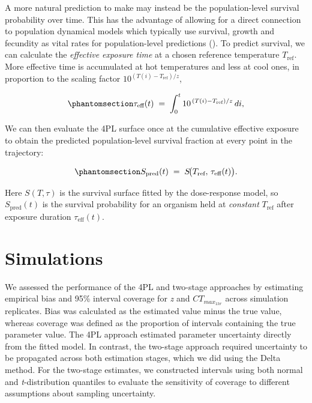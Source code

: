 \documentclass[
  11pt,
]{article}
\begin{document}
A more natural prediction to make may instead be the population-level
survival probability over time. This has the advantage of allowing for a
direct connection to population dynamical models which typically use
survival, growth and fecundity as vital rates for population-level
predictions (). To
predict survival, we can calculate the \emph{effective exposure time} at
a chosen reference temperature \(T_{\text{ref}}\). More effective time
is accumulated at hot temperatures and less at cool ones, in proportion
to the scaling factor \(10^{(T(i) - T_{\text{ref}})/z}\),

\begin{equation}\phantomsection\label{eq-tau-eff}{
\tau_{\text{eff}}(t) \;=\; \int_0^t 10^{\,(T(i) - T_{\text{ref}})/z}\,di,
}\end{equation}

We can then evaluate the 4PL surface once at the cumulative effective
exposure to obtain the predicted population-level survival fraction at
every point in the trajectory:

\begin{equation}\phantomsection\label{eq-S-pred}{
S_{\text{pred}}(t) \;=\; S\!\big(T_{\text{ref}},\, \tau_{\text{eff}}(t)\big).
}\end{equation}

Here \(S(T, \tau)\) is the survival surface fitted by the dose-response
model, so \(S_{\text{pred}}(t)\) is the survival probability for an
organism held at \emph{constant} \(T_{\text{ref}}\) after exposure
duration \(\tau_{\text{eff}}(t)\).

\section{Simulations}\label{simulations}

We assessed the performance of the 4PL and two-stage approaches by
estimating empirical bias and 95\% interval coverage for \emph{z} and
\(CT_{max_{1hr}}\) across simulation replicates. Bias was calculated as
the estimated value minus the true value, whereas coverage was defined
as the proportion of intervals containing the true parameter value. The
4PL approach estimated parameter uncertainty directly from the fitted
model. In contrast, the two-stage approach required uncertainty to be
propagated across both estimation stages, which we did using the Delta
method. For the two-stage estimates, we constructed intervals using both
normal and \emph{t}-distribution quantiles to evaluate the sensitivity
of coverage to different assumptions about sampling uncertainty.
\end{document}
